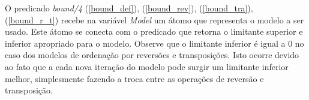 O predicado \textit{bound/4} (\ref{bound_def}), (\ref{bound_rev}),
(\ref{bound_tra}), (\ref{bound_r_t}) recebe na variável \textit{Model}
um átomo que representa o modelo a ser usado. Este átomo se conecta
com o predicado que retorna o limitante superior e inferior apropriado
para o modelo. Observe que o limitante inferior é igual a $0$ no caso
dos modelos de ordenação por reversões e transposições. Isto ocorre
devido ao fato que a cada nova iteração do modelo pode surgir um
limitante inferior melhor, simplesmente fazendo a troca entre as
operações de reversão e transposição.
%
